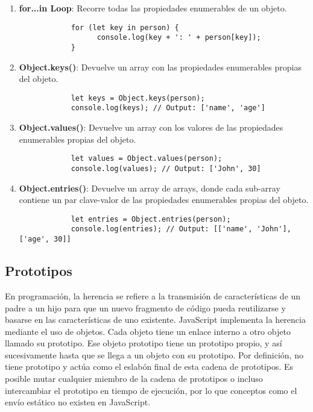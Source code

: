 \documentclass{article}
\begin{document}
\begin{enumerate}
      \item \textbf{for...in Loop}: Recorre todas las propiedades enumerables de un objeto.
            \begin{lstlisting}
            for (let key in person) {
                  console.log(key + ': ' + person[key]);
            }
            \end{lstlisting}

      \item \textbf{Object.keys()}: Devuelve un array con las propiedades enumerables propias del objeto.
            \begin{lstlisting}
            let keys = Object.keys(person);
            console.log(keys); // Output: ['name', 'age']
            \end{lstlisting}

      \item \textbf{Object.values()}: Devuelve un array con los valores de las propiedades enumerables propias del objeto.
            \begin{lstlisting}
            let values = Object.values(person);
            console.log(values); // Output: ['John', 30]
            \end{lstlisting}

      \item \textbf{ Object.entries()}: Devuelve un array de arrays, donde cada sub-array contiene un par clave-valor de las propiedades enumerables propias del objeto.
            \begin{lstlisting}
            let entries = Object.entries(person);
            console.log(entries); // Output: [['name', 'John'], ['age', 30]]
            \end{lstlisting}
\end{enumerate}


\subsection{Prototipos}

En programación, la herencia se refiere a la transmisión de características de un padre a un hijo para que un nuevo fragmento de código pueda reutilizarse
y basarse en las características de uno existente. JavaScript implementa la herencia mediante el uso de objetos. Cada objeto tiene un enlace interno a otro
objeto llamado su prototipo. Ese objeto prototipo tiene un prototipo propio, y así sucesivamente hasta que se llega a un objeto con su prototipo. Por definición,
no tiene prototipo y actúa como el eslabón final de esta cadena de prototipos. Es posible mutar cualquier miembro de la cadena de prototipos o incluso intercambiar
el prototipo en tiempo de ejecución, por lo que conceptos como el envío estático no existen en JavaScript.
\end{document}
